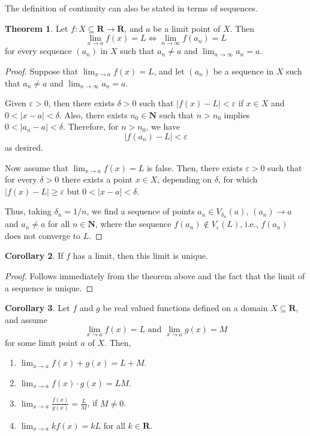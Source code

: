 \documentclass[tikz,12pt,a4paper]{article}
\theoremstyle{definition}
\newtheorem{theorem}{Theorem}[section]
\newtheorem{corollary}[theorem]{Corollary}
\begin{document}
The definition of continuity can also be stated in terms of sequences.

\begin{theorem}
	Let $f : X \subseteq \textbf{R} \longrightarrow \textbf{R}$, and $a$ be a limit point of $X$. Then 
	\[
		\lim_{x \to a} f(x) = L \iff \lim_{n \to \infty} f(a_n) = L
	\]
	for every sequence $(a_n)$ in $X$ such that $a_n \neq a$ and $\lim_{n \to \infty} a_n = a$.
\end{theorem}

\begin{proof}
	Suppose that $\lim_{x \to a} f(x) = L$, and let $(a_n)$ be a sequence in $X$ such that $a_n \neq a$ and $\lim_{n \to \infty} a_n = a$.
	
	Given $\varepsilon > 0$, then there exists $\delta > 0$ such that $|f(x) - L| < \varepsilon$ if $x \in X$ and $0 < |x - a| < \delta$. Also, there exists $n_0 \in \textbf{N}$ such that $n > n_0$ implies $0 < |a_n - a| < \delta$. Therefore, for $n > n_0$, we have \[ | f(a_n) - L | < \varepsilon \] as desired.
	
	Now assume that $\lim_{x \to a} f(x) = L$ is false. Then, there exists $\varepsilon > 0$ such that for every $\delta > 0$ there exists a point $x \in X$, depending on $\delta$, for which $| f(x) - L | \geq \varepsilon$ but $0 < |x - a| < \delta$.
	
	Thus, taking $\delta_n = 1/n$, we find a sequence of points $a_n \in V_{\delta_n}(a)$, $(a_n) \to a$ and $a_n \neq a$ for all $n \in \textbf{N}$, where the sequence $f(a_n) \notin V_{\varepsilon}(L)$, i.e., $f(a_n)$ does not converge to $L$.
\end{proof}

\begin{corollary}
	If $f$ has a limit, then this limit is unique.
\end{corollary}

\begin{proof}
	Follows immediately from the theorem above and the fact that the limit of a sequence is unique.
\end{proof}

\begin{corollary}
	Let $f$ and $g$ be real valued functions defined on a domain $X \subseteq \textbf{R}$, and assume 
	\[
		\lim_{x \to a} f(x) = L \text{ and } \lim_{x \to a} g(x) = M
	\]
	for some limit point $a$ of $X$. Then,
	\begin{enumerate}
		\item $\lim_{x \to a} f(x) + g(x) = L + M$.
		\item $\lim_{x \to a} f(x) \cdot g(x) = LM$.
		\item $\lim_{x \to a} \frac{f(x)}{g(x)} = \frac{L}{M}$, if $M \neq 0$.
		\item $\lim_{x \to a} kf(x) = kL$ for all $k \in \textbf{R}$.
	\end{enumerate}
\end{corollary}
\end{document}
